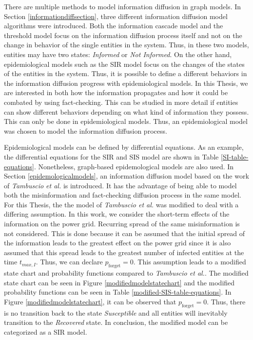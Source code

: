 There are multiple methods to model information diffusion in graph models.
In Section \ref{informationdiffsection}, three different information diffusion
model algorithms were introduced.
Both the information cascade model and the threshold model focus on the 
information diffusion process itself and not on the change in behavior
of the single entities in the system. Thus, in these two models,
entities may have two states: 
\textit{Informed} or \textit{Not Informed}.
On the other hand, epidemiological models such as the SIR model
focus on the changes of the states of the entities in the system.
Thus, it is possible to define a different behaviors in the
information diffusion progress with epidemiological models. 
In this Thesis, we are interested in both how the information
propagates and how it could be combated by using fact-checking.
This can be studied in more detail if entities can 
show different behaviors depending on what kind of information
they possess. This can only be done in epidemiological models.
Thus, an epidemiological model was chosen to model the information 
diffusion process.

Epidemiological models can be defined by differential equations.
As an example, the differential equations for the SIR and SIS 
model are shown in Table \ref{SI-table-equations}.
Nonetheless, graph-based epidemological models are also used.
In Section \ref{epidemologicalmodels}, an information 
diffusion model based on the work of \textit{Tambuscio et al.} 
\cite{sirsmodel} is introduced. It has the advantage of being 
able to model both the misinformation and fact-checking 
diffusion process in the same model. 
For this Thesis, the the model of \textit{Tambuscio et al.} was
modified to deal with a differing assumption.
In this work, we consider the short-term effects of the information 
on the power grid. Recurring spread of the same misinformation
is not considered. This is done because it can be 
assumed that the initial spread of the information leads to the 
greatest effect on the power grid since it is also assumed that this
spread leads to the greatest number of infected entities at
the time $t_{max,I}$. Thus, we can declare $p_{\mathrm{forget}} = 0$.
This assumption leads to a modified state chart and probability
functions compared to \textit{Tambuscio et al.}. The modified
state chart can be seen in Figure \ref{modifiedmodelstatechart}
and the modified probability functions can be seen in Table
\ref{modified-SIS-table-equations}. In Figure 
\ref{modifiedmodelstatechart}, it can be observed that 
$p_{\mathrm{forget}} = 0$. Thus, there is no transition back to 
the state \textit{Susceptible} and all entities
will inevitably transition to the \textit{Recovered} state. 
In conclusion, the modified model can be categorized as a SIR model. 


